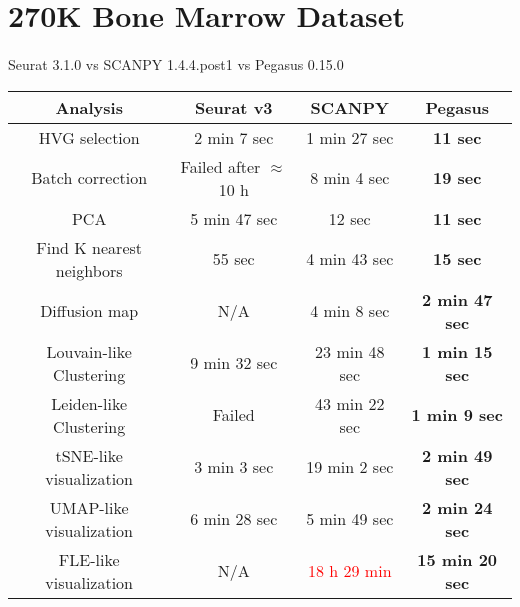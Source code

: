 \documentclass[10pt]{article}
\begin{document}
\section{270K Bone Marrow Dataset}

\paragraph{}
Seurat 3.1.0 \qquad vs \qquad SCANPY 1.4.4.post1 \qquad vs \qquad Pegasus 0.15.0

\begin{table}[H]
	\centering
	\begin{tabular}{|c|c|c|c|}
		\hline
		Analysis & Seurat v3 & SCANPY & Pegasus\\
		\hline \hline
		HVG selection & 2 min 7 sec & 1 min 27 sec & \textbf{11 sec} \\
		\hline
		Batch correction & Failed after $\approx$ 10 h & 8 min 4 sec & \textbf{19 sec} \\
		\hline
		PCA & 5 min 47 sec & 12 sec & \textbf{11 sec} \\
		\hline
		Find K nearest neighbors &  55 sec &  4 min 43 sec & \textbf{15 sec}\\
		\hline
		Diffusion map & N/A & 4 min 8 sec & \textbf{2 min 47 sec} \\
		\hline
		Louvain-like Clustering & 9 min 32 sec & 23 min 48 sec & \textbf{1 min 15 sec} \\
		\hline 
		Leiden-like Clustering & Failed & 43 min 22 sec & \textbf{1 min 9 sec}\\
		\hline
		tSNE-like visualization & 3 min 3 sec & 19 min 2 sec & \textbf{2 min 49 sec}\\
		\hline
		UMAP-like visualization & 6 min 28 sec & 5 min 49 sec  & \textbf{2 min 24 sec}\\
		\hline
		FLE-like visualization & N/A & \textcolor{red}{18 h 29 min} & \textbf{15 min 20 sec}\\
		\hline
	\end{tabular}
\end{table}
\end{document}
